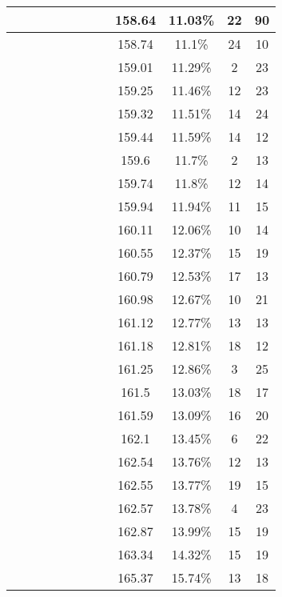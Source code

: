 \begin{center}
\begin{longtable}{|c|c|c|c|c|c|c|c|c|c|c|c|}
 \x &  \x &  &  \x &  \x &  &  &  \x & 158.64 & 11.03\% & 22 & 90 \\ \hline
 \x &  \x &  &  &  &  &  \x &  \x & 158.74 & 11.1\% & 24 & 10 \\ \hline
 \x &  \x &  &  &  \x &  \x &  \x &  & 159.01 & 11.29\% & 2 & 23 \\ \hline
 \x &  &  \x &  &  \x &  &  \x &  \x & 159.25 & 11.46\% & 12 & 23 \\ \hline
 \x &  \x &  \x &  \x &  \x &  &  \x &  & 159.32 & 11.51\% & 14 & 24 \\ \hline
 \x &  \x &  \x &  &  \x &  &  \x &  \x & 159.44 & 11.59\% & 14 & 12 \\ \hline
 \x &  &  \x &  &  &  \x &  \x &  \x & 159.6 & 11.7\% & 2 & 13 \\ \hline
 \x &  \x &  \x &  &  \x &  &  &  & 159.74 & 11.8\% & 12 & 14 \\ \hline
 \x &  &  &  \x &  &  &  \x &  \x & 159.94 & 11.94\% & 11 & 15 \\ \hline
 \x &  \x &  &  \x &  &  \x &  \x &  & 160.11 & 12.06\% & 10 & 14 \\ \hline
 \x &  \x &  \x &  \x &  \x &  &  &  & 160.55 & 12.37\% & 15 & 19 \\ \hline
 \x &  &  &  &  \x &  &  \x &  \x & 160.79 & 12.53\% & 17 & 13 \\ \hline
 \x &  &  &  &  &  &  \x &  & 160.98 & 12.67\% & 10 & 21 \\ \hline
 \x &  \x &  &  \x &  \x &  &  \x &  & 161.12 & 12.77\% & 13 & 13 \\ \hline
 \x &  &  &  &  &  &  \x &  \x & 161.18 & 12.81\% & 18 & 12 \\ \hline
 \x &  &  \x &  &  &  &  \x &  \x & 161.25 & 12.86\% & 3 & 25 \\ \hline
 \x &  &  \x &  \x &  \x &  &  &  \x & 161.5 & 13.03\% & 18 & 17 \\ \hline
 \x &  &  &  &  \x &  &  \x &  & 161.59 & 13.09\% & 16 & 20 \\ \hline
 \x &  \x &  &  \x &  &  &  \x &  \x & 162.1 & 13.45\% & 6 & 22 \\ \hline
 \x &  &  \x &  &  \x &  &  \x &  & 162.54 & 13.76\% & 12 & 13 \\ \hline
 \x &  \x &  &  \x &  \x &  &  &  & 162.55 & 13.77\% & 19 & 15 \\ \hline
 \x &  &  &  \x &  &  \x &  \x &  \x & 162.57 & 13.78\% & 4 & 23 \\ \hline
 \x &  &  &  \x &  \x &  &  &  & 162.87 & 13.99\% & 15 & 19 \\ \hline
 \x &  &  &  \x &  \x &  &  \x &  & 163.34 & 14.32\% & 15 & 19 \\ \hline
 \x &  &  \x &  \x &  \x &  \x &  &  & 165.37 & 15.74\% & 13 & 18 \\ \hline
\end{longtable}
\label{table:windProdInputParams}
\end{center}
\normalsize